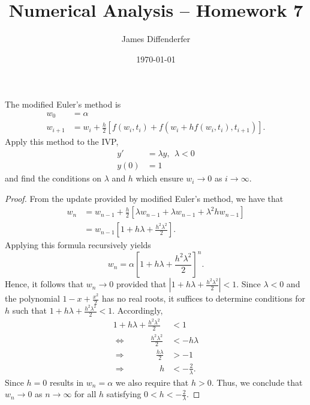 \documentclass[8pt]{article}
\title{Numerical Analysis -- Homework 7}
\author{James Diffenderfer}
\date{\today}
\theoremstyle{definition}
\newenvironment{exercise}[1]
  {\renewcommand\theinnerexercise{#1}\innerexercise}
  {\endinnerexercise}
\begin{document}
\maketitle


\begin{exercise}{1}
The modified Euler's method is 
\begin{align*}
w_0 &= \alpha \\
w_{i+1} &= w_i + \frac{h}{2} \left[ f (w_i, t_i) + f (w_i + h f (w_i, t_i), t_{i+1}) \right].
\end{align*}
Apply this method to the IVP, 
\begin{align*}
y' &= \lambda y, \ \ \lambda < 0 \\
y(0) &= 1
\end{align*}
and find the conditions on $\lambda$ and $h$ which ensure $w_{i} \to 0$ as $i \to \infty$.
\end{exercise}

\begin{proof}
From the update provided by modified Euler's method, we have that 
\begin{align*}
w_{n} &= w_{n-1} + \frac{h}{2} \left[ \lambda w_{n-1} + \lambda w_{n-1} + \lambda^2 h w_{n-1} \right] \\
&= w_{n-1} \left[ 1 + h \lambda + \frac{h^2 \lambda^2}{2} \right].
\end{align*}
Applying this formula recursively yields $$w_{n} = \alpha \left[ 1 + h \lambda + \frac{h^2 \lambda^2}{2} \right]^n.$$ Hence, it follows that $w_n \to 0$ provided that $\left| 1 + h \lambda + \frac{h^2 \lambda^2}{2} \right| < 1$. Since $\lambda < 0$ and the polynomial $1 - x + \frac{x^2}{2}$ has no real roots, it suffices to determine conditions for $h$ such that $1 + h \lambda + \frac{h^2 \lambda^2}{2} < 1$. Accordingly,
\begin{align}
1 + h \lambda + \frac{h^2 \lambda^2}{2} &< 1 \nonumber \\
\Longleftrightarrow \ \ \ \ \ \ \ \ \ \ \ \ \ \frac{h^2 \lambda^2}{2} &< - h \lambda \nonumber \\
\Longrightarrow \ \ \ \ \ \ \ \ \ \ \ \ \ \ \ \ \frac{h \lambda}{2} &> -1 \tag{Since $h > 0$ and $\lambda < 0$} \\
\Longrightarrow \ \ \ \ \ \ \ \ \ \ \ \ \ \ \ \ \ \ h &< -\frac{2}{\lambda}. \tag{Since $\lambda < 0$}
\end{align}
Since $h = 0$ results in $w_n = \alpha$ we also require that $h > 0$. Thus, we conclude that $w_n \to 0$ as $n \to \infty$ for all $h$ satisfying $0 < h < - \frac{2}{\lambda}$.
\end{proof}
\newpage
\end{document}
